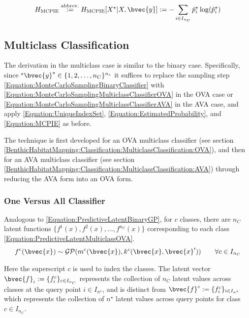 			\begin{equation}
				H_{\mathrm{MCPIE}} \stackrel{\text{abbrev.}}{:=} H_{\mathrm{MCPIE}}[X^{\star} | X, \bvec{y}] := - \sum_{i \in I_{n_{U}}} \tilde{p}^{\star}_{i} \log(\tilde{p}^{\star}_{i})
			\label{Equation:MCPIE}
			\end{equation}		
			
		\subsection{Multiclass Classification}
		\label{InformativeSeafloorExploration:MCPIE:Multiclass}
		
			The derivation in the multiclass case is similar to the binary case. Specifically, since ${^{s}}\bvec{y}^{\star} \in \{1, 2, \dots, n_{C}\}^{n_{s}}$ it suffices to replace the sampling step \eqref{Equation:MonteCarloSamplingBinaryClassifier} with \eqref{Equation:MonteCarloSamplingMulticlassClassifierOVA} in the OVA case or \eqref{Equation:MonteCarloSamplingMulticlassClassifierAVA} in the AVA case, and apply \eqref{Equation:UniqueIndexSet}, \eqref{Equation:EstimatedProbability}, and \eqref{Equation:MCPIE} as before.
			
			The technique is first developed for an OVA multiclass classifier (see section \ref{BenthicHabitatMapping:Classification:MulticlassClassification:OVA}), and then for an AVA multiclass classifier (see section \ref{BenthicHabitatMapping:Classification:MulticlassClassification:AVA}) through reducing the AVA form into an OVA form. 
			
			\subsubsection{One Versus All Classifier}
			\label{InformativeSeafloorExploration:MCPIE:Multiclass:OVA}
			
				Analogous to \eqref{Equation:PredictiveLatentBinaryGP}, for $c$ classes, there are $n_{C}$ latent functions $\{f^{1}(x), f^{2}(x), \dots, f^{n_{C}}(x)\}$ corresponding to each class \eqref{Equation:PredictiveLatentMulticlassOVA}. \begin{equation}
					f^{c}(\bvec{x}) \sim \mathcal{GP}(m^{c}(\bvec{x}), k^{c}(\bvec{x}, \bvec{x}')) \qquad \forall c \in I_{n_{C}}
				\label{Equation:PredictiveLatentMulticlassOVA}
				\end{equation}
							
				Here the superscript $c$ is used to index the classes. The latent vector $\bvec{f}_{i} := \{f^{c}_{i}\}_{c \in I_{n_{C}}}$ represents the collection of $n_{C}$ latent values across classes at the query point $i \in I_{n^{\star}}$, and is distinct from $\bvec{f}^{c} := \{f^{c}_{i}\}_{i \in I_{n^{\star}}}$ which represents the collection of $n^{\star}$ latent values across query points for class $c \in I_{n_{C}}$.
				

